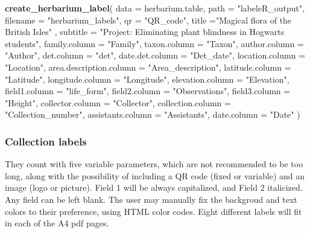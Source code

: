 \documentclass[10pt,a4paper,onecolumn]{article}
\newenvironment{Shaded}{\begin{snugshade}}{\end{snugshade}}
\newcommand{\AttributeTok}[1]{\textcolor[rgb]{0.13,0.29,0.53}{#1}}
\newcommand{\FunctionTok}[1]{\textcolor[rgb]{0.13,0.29,0.53}{\textbf{#1}}}
\newcommand{\NormalTok}[1]{#1}
\newcommand{\StringTok}[1]{\textcolor[rgb]{0.31,0.60,0.02}{#1}}
\begin{document}
\begin{Shaded}
\begin{Highlighting}[]
\FunctionTok{create\_herbarium\_label}\NormalTok{(}
  \AttributeTok{data =}\NormalTok{ herbarium.table,}
  \AttributeTok{path =} \StringTok{"labeleR\_output"}\NormalTok{,}
  \AttributeTok{filename =} \StringTok{"herbarium\_labels"}\NormalTok{,}
  \AttributeTok{qr =} \StringTok{"QR\_code"}\NormalTok{,}
  \AttributeTok{title =}\StringTok{"Magical flora of the British Isles"}\NormalTok{ ,}
  \AttributeTok{subtitle =} \StringTok{"Project: Eliminating plant blindness in Hogwarts students"}\NormalTok{,}
  \AttributeTok{family.column =} \StringTok{"Family"}\NormalTok{,}
  \AttributeTok{taxon.column =} \StringTok{"Taxon"}\NormalTok{,}
  \AttributeTok{author.column =} \StringTok{"Author"}\NormalTok{,}
  \AttributeTok{det.column =} \StringTok{"det"}\NormalTok{,}
  \AttributeTok{date.det.column =} \StringTok{"Det\_date"}\NormalTok{,}
  \AttributeTok{location.column =} \StringTok{"Location"}\NormalTok{,}
  \AttributeTok{area.description.column =} \StringTok{"Area\_description"}\NormalTok{,}
  \AttributeTok{latitude.column =} \StringTok{"Latitude"}\NormalTok{,}
  \AttributeTok{longitude.column =} \StringTok{"Longitude"}\NormalTok{,}
  \AttributeTok{elevation.column =} \StringTok{"Elevation"}\NormalTok{,}
  \AttributeTok{field1.column =} \StringTok{"life\_form"}\NormalTok{,}
  \AttributeTok{field2.column =} \StringTok{"Observations"}\NormalTok{,}
  \AttributeTok{field3.column =} \StringTok{"Height"}\NormalTok{,}
  \AttributeTok{collector.column =} \StringTok{"Collector"}\NormalTok{,}
  \AttributeTok{collection.column =} \StringTok{"Collection\_number"}\NormalTok{,}
  \AttributeTok{assistants.column =} \StringTok{"Assistants"}\NormalTok{,}
  \AttributeTok{date.column =} \StringTok{"Date"}
\NormalTok{)}
\end{Highlighting}
\end{Shaded}

\subsubsection{Collection labels}\label{collection-labels}

They count with five variable parameters, which are not recommended to
be too long, along with the possibility of including a QR code (fixed or
variable) and an image (logo or picture). Field 1 will be always
capitalized, and Field 2 italicized. Any field can be left blank. The
user may manually fix the backgroud and text colors to their preference,
using HTML color codes. Eight different labels will fit in each of the
A4 pdf pages.
\end{document}
